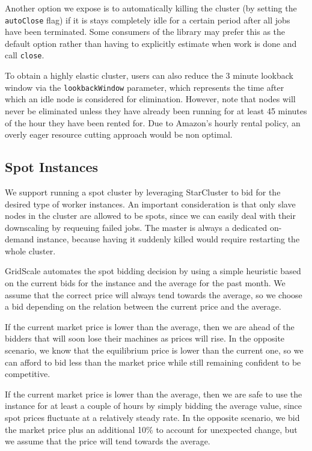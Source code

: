 Another option we expose is to automatically killing the cluster (by setting the \verb|autoClose| flag) if it is stays completely idle for a certain period after all jobs have been terminated. Some consumers of the library may prefer this as the default option rather than having to explicitly estimate when work is done and call \verb|close|.

To obtain a highly elastic cluster, users can also reduce the 3 minute lookback window via the \verb|lookbackWindow| parameter, which represents the time after which an idle node is considered for elimination. However, note that nodes will never be eliminated unless they have already been running for at least 45 minutes of the hour they have been rented for. Due to Amazon's hourly rental policy, an overly eager resource cutting approach would be non optimal.

\subsection{Spot Instances}

We support running a spot cluster by leveraging StarCluster to bid for the desired type of worker instances. An important consideration is that only slave nodes in the cluster are allowed to be spots, since we can easily deal with their downscaling by requeuing failed jobs. The master is always a dedicated on-demand instance, because having it suddenly killed would require restarting the whole cluster.

GridScale automates the spot bidding decision by using a simple heuristic based on the current bids for the instance and the average for the past month. We assume that the correct price will always tend towards the average, so we choose a bid depending on the relation between the current price and the average. 

If the current market price is lower than the average, then we are ahead of the bidders that will soon lose their machines as prices will rise. In the opposite scenario, we know that the equilibrium price is lower than the current one, so we can afford to bid less than the market price while still remaining confident to be competitive.

If the current market price is lower than the average, then we are safe to use the instance for at least a couple of hours by simply bidding the average value, since spot prices fluctuate at a relatively steady rate. In the opposite scenario, we bid the market price plus an additional 10\% to account for unexpected change, but we assume that the price will tend towards the average.

